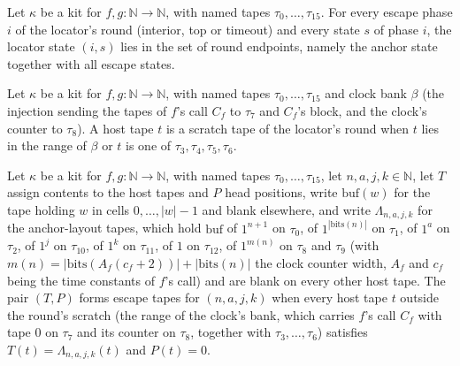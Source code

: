 \begin{theorem}
\label{Turing.NTimeDiag.qy_esc_mem}
\leanok
{}
Let $\kappa$ be a kit for $f, g : \mathbb{N} \to \mathbb{N}$, with named tapes $\tau_0, \dots,
\tau_{15}$. For every escape phase $i$ of the locator's round (interior, top or timeout) and every
state $s$ of phase $i$, the locator state $(i, s)$ lies in the set of round endpoints, namely the
anchor state together with all escape states.
\end{theorem}

\begin{definition}
\label{Turing.NTimeDiag.qyScratch}
\leanok
{}
Let $\kappa$ be a kit for $f, g : \mathbb{N} \to \mathbb{N}$, with named tapes $\tau_0, \dots,
\tau_{15}$ and clock bank $\beta$ (the injection sending the tapes of $f$'s call $C_f$ to $\tau_7$
and $C_f$'s block, and the clock's counter to $\tau_8$). A host tape $t$ is a scratch tape of the
locator's round when $t$ lies in the range of $\beta$ or $t$ is one of $\tau_3, \tau_4, \tau_5,
\tau_6$.
\end{definition}

\begin{definition}
\label{Turing.NTimeDiag.QyEscT}
\leanok
{}
Let $\kappa$ be a kit for $f, g : \mathbb{N} \to \mathbb{N}$, with named tapes $\tau_0, \dots,
\tau_{15}$, let $n, a, j, k \in \mathbb{N}$, let $T$ assign contents to the host tapes and $P$ head
positions, write $\mathrm{buf}(w)$ for the tape holding $w$ in cells $0, \dots, |w| - 1$ and blank
elsewhere, and write $\Lambda_{n,a,j,k}$ for the anchor-layout tapes, which hold $\mathrm{buf}$ of
$1^{n+1}$ on $\tau_0$, of $1^{|\mathrm{bits}(n)|}$ on $\tau_1$, of $1^a$ on $\tau_2$, of $1^j$ on
$\tau_{10}$, of $1^k$ on $\tau_{11}$, of $1$ on $\tau_{12}$, of $1^{m(n)}$ on $\tau_8$ and $\tau_9$
(with $m(n) = |\mathrm{bits}(A_f(c_f + 2))| + |\mathrm{bits}(n)|$ the clock counter width, $A_f$
and $c_f$ being the time constants of $f$'s call) and are blank on every other host tape. The pair
$(T, P)$ forms escape tapes for $(n, a, j, k)$ when every host tape $t$ outside the round's scratch
(the range of the clock's bank, which carries $f$'s call $C_f$ with tape $0$ on $\tau_7$ and its
counter on $\tau_8$, together with $\tau_3, \dots, \tau_6$) satisfies $T(t) = \Lambda_{n,a,j,k}(t)$
and $P(t) = 0$.
\end{definition}

